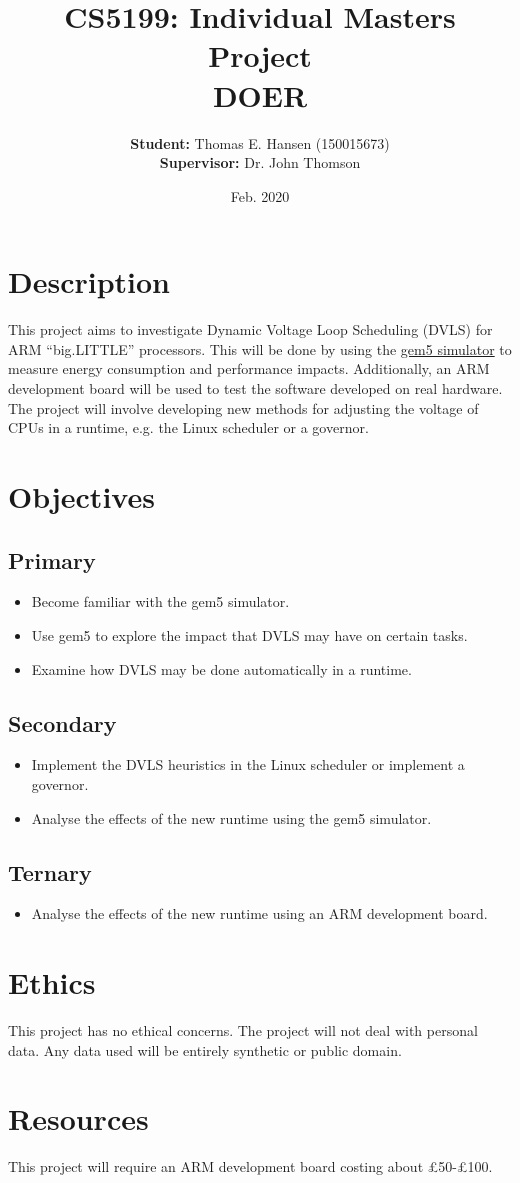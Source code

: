 \documentclass[11pt]{article}
\title{CS5199: Individual Masters Project\\DOER}
\author{\textbf{Student:} Thomas E. Hansen (150015673)\\\textbf{Supervisor:}
    Dr. John Thomson}
\date{Feb. 2020}
\begin{document}
    
    \maketitle
    
    \section{Description}
    This project aims to investigate Dynamic Voltage Loop Scheduling (DVLS) for
    ARM ``big.LITTLE'' processors. This will be done by using the
    \href{http://www.gem5.org/Main_Page}{gem5 simulator} to measure energy
    consumption and performance impacts. Additionally, an ARM development board
    will be used to test the software developed on real hardware. The project
    will involve developing new methods for adjusting the voltage of CPUs in a
    runtime, e.g. the Linux scheduler or a governor.
    
    \section{Objectives}
        \subsection{Primary}
        \begin{itemize}
            \item Become familiar with the gem5 simulator.
            \item Use gem5 to explore the impact that DVLS may have on certain
                  tasks.
            \item Examine how DVLS may be done automatically in a runtime.
        \end{itemize}
        
        \subsection{Secondary}
        \begin{itemize}
            \item Implement the DVLS heuristics in the Linux scheduler or
                  implement a governor.
            \item Analyse the effects of the new runtime using the gem5
                  simulator.
        \end{itemize}
        
        \subsection{Ternary}
        \begin{itemize}
            \item Analyse the effects of the new runtime using an ARM
                  development board.
        \end{itemize}
        
    \section{Ethics}
    This project has no ethical concerns. The project will not deal with
    personal data. Any data used will be entirely synthetic or public domain.
    
    \section{Resources}
    This project will require an ARM development board costing about £50-£100.
\end{document}
